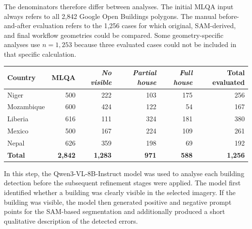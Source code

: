 The denominators therefore differ between analyses. The initial MLQA input always refers to all 2,842 Google Open Buildings polygons. The manual before-and-after evaluation refers to the 1,256 cases for which original, SAM-derived, and final workflow geometries could be compared. Some geometry-specific analyses use \(n=1,253\) because three evaluated cases could not be included in that specific calculation.

\begin{table}[htp]
	\begin{center}
		\begin{tabular}{lrrrrr}
			\toprule
			Country &
			MLQA &
			\textit{No visible} &
			\textit{Partial house} &
			\textit{Full house} &
			Total evaluated \\
			\midrule
			Niger      & 500 & 222 & 103 & 175 & 256 \\
			Mozambique & 600 & 424 & 122 & 54  & 167 \\
			Liberia    & 616 & 111 & 324 & 181 & 380 \\
			Mexico     & 500 & 167 & 224 & 109 & 261 \\
			Nepal      & 626 & 359 & 198 & 69  & 192 \\
			\midrule
			\textbf{Total} &
			\textbf{2,842} &
			\textbf{1,283} &
			\textbf{971} &
			\textbf{588} &
			\textbf{1,256} \\
			\bottomrule
		\end{tabular}
		\label{tab:mlqa_overview}
	\end{center}
\end{table}

In this step, the Qwen3-VL-8B-Instruct model was used to analyse each building detection before the subsequent refinement stages were applied. The model first identified whether a building was clearly visible in the selected imagery. If the building was visible, the model then generated positive and negative prompt points for the SAM-based segmentation and additionally produced a short qualitative description of the detected errors.

